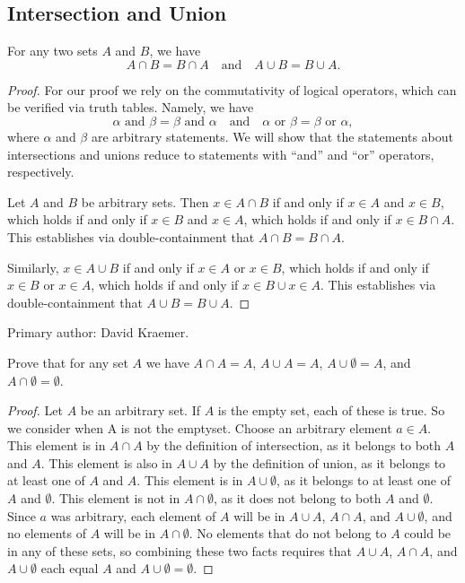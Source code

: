 \subsection{Intersection and Union}%

\begin{majorEx} %
    [Commutativity of $\cap$ and $\cup$]
    For any two sets $A$ and $B$, we have
    \[
        A \cap B = B \cap A \quad \text{and} \quad A \cup B = B \cup A.
    \]
\end{majorEx}

\begin{proof}
    For our proof we rely on the commutativity of logical operators, which can
    be verified via truth tables. Namely, we have
    \[
        \alpha \text{ and } \beta = \beta \text{ and } \alpha \quad \text{and}
        \quad \alpha \text{ or } \beta = \beta \text{ or } \alpha, 
    \]
    where $\alpha$ and $\beta$ are arbitrary statements. We will show that the
    statements about intersections and unions reduce to statements with ``and''
    and ``or'' operators, respectively.

    Let $A$ and $B$ be arbitrary sets. Then $x \in A \cap B$ if and only if $x
    \in A$ and $x \in B$, which holds if and only if $x \in B$ and $x \in A$,
    which holds if and only if $x \in B \cap A$. This establishes via
    double-containment that $A \cap B = B \cap A$.

    Similarly, $x \in A \cup B$ if and only if $x \in A$ or $x \in B$, which
    holds if and only if $x \in B$ or $x \in A$, which holds if and only if $x
    \in B \cup x \in A$. This establishes via double-containment that $A \cup B
    = B \cup A$.
\end{proof}

Primary author: David Kraemer.

\begin{minorEx}%
    Prove that for any set $A$ we have $ A \cap A = A$, $A \cup A = A$, $A \cup
    \emptyset = A$, and $A \cap \emptyset = \emptyset$.
\end{minorEx}

\begin{proof}
    Let $A$ be an arbitrary set. If $A$ is the empty set, each of these is
    true. So we consider when A is not the emptyset. Choose an arbitrary
    element $a \in A$. This element is in $A \cap A$ by the definition of
    intersection, as it belongs to both $A$ and $A$. This element is also in
    $A \cup A$ by the definition of union, as it belongs to at least one of
    $A$ and $A$. This element is in $A \cup \emptyset$, as it belongs to at
    least one of $A$ and $\emptyset$. This element is not in $A \cap
    \emptyset$, as it does not belong to both $A$ and $\emptyset$. Since $a$
    was arbitrary, each element of $A$ will be in $A \cup A$, $A \cap A$,
    and $A \cup \emptyset$, and no elements of $A$ will be in $A \cap
    \emptyset$. No elements that do not belong to $A$ could be in any of
    these sets, so combining these two facts requires that $A \cup A$, $A
    \cap A$, and $A \cup \emptyset$ each equal $A$ and $A \cup \emptyset =
    \emptyset$.
\end{proof}

